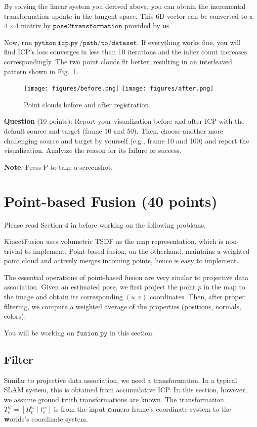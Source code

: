 \documentclass[12pt, a4paper]{article}
\begin{document}
By solving the linear system you derived above, you can obtain the incremental transformation update in the tangent space. This 6D vector can be converted to a $4\times 4$ matrix by $\mathtt{pose2transformation}$ provided by us.

Now, run $\mathtt{python~icp.py~/path/to/dataset}$. If everything works fine, you will find ICP's loss converges in less than 10 iterations and the inlier count increases correspondingly. The two point clouds fit better, resulting in an interleaved pattern shown in Fig.~\ref{fig:icp}.
\begin{figure}
    \texttt{[image: figures/before.png]}
    \texttt{[image: figures/after.png]}
    \caption{Point clouds before and after registration.}\label{fig:icp}
\end{figure}

\textbf{Question} (10 points): Report your visualization before and after ICP with the default source and target (frame 10 and 50). Then, choose another more challenging source and target by yourself (e.g., frame 10 and 100) and report the visualization. Analyize the reason for its failure or success.

\textbf{Note}: Press P to take a screenshot.

\section{Point-based Fusion (40 points)}

Please read Section 4 in \cite{fusion} before working on the following
problems.

KinectFusion uses volumetric TSDF as the map representation, which is non-trivial to implement. Point-based fusion, on the otherhand, maintains a weighted point cloud and actively merges incoming points, hence is easy to implement.

The essential operations of point-based fusion are very similar to projective data association. Given an estimated pose, we first project the point $p$ in the map to the image and obtain its corresponding $(u, v)$ coordinates. Then, after proper filtering, we compute a weighted average of the properties (positions, normals, colors).

You will be working on $\mathtt{fusion.py}$ in this section.

\subsection{Filter}
Similar to projective data association, we need a transformation. In a typical SLAM system, this is obtained from accumulative ICP. In this section, however, we assume ground truth transformations are known. The transformation $T_c^w = [R_c^w \mid t_c^w]$ is from the input \textbf{c}amera frame's coordinate system to the \textbf{w}orlds's coordinate system.
\end{document}
